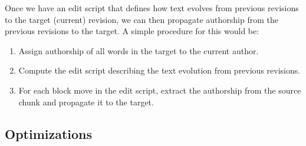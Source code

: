 Once we have an edit script that defines how text evolves from
previous revisions to the target (current) revision, we can then propagate
authorship from the previous revisions to the target.
A simple procedure for this would be:
\begin{enumerate}
\item Assign authorship of all words in the target to the current author.
\item Compute the edit script describing the text evolution from
    previous revisions.
\item For each block move in the edit script, extract the authorship
    from the source chunk and propagate it to the target.
\end{enumerate}

\subsection{Optimizations}
\label{sec:diff-optimizations}

